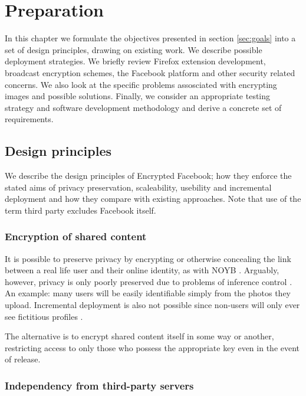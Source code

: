\chapter{Preparation}\label{ch:preparation}

In this chapter we formulate the objectives presented in section \ref{sec:goals} into a set of design principles, drawing on existing work. We describe possible deployment strategies. We briefly review Firefox extension development, broadcast encryption schemes, the Facebook platform and other security related concerns. We also look at the specific problems assosciated with encrypting images and possible solutions. Finally, we consider an appropriate testing strategy and software development methodology and derive a concrete set of requirements.


\FloatBarrier
\section{Design principles}


We describe the design principles of Encrypted Facebook; how they enforce the stated aims of privacy preservation, scaleability, usebility and incremental deployment and how they compare with existing approaches. Note that use of the term third party excludes Facebook itself.


\FloatBarrier
\subsection{Encryption of shared content}

It is possible to preserve privacy by encrypting or otherwise concealing the link between a real life user and their online identity, as with NOYB \cite{noyb}. Arguably, however, privacy is only poorly preserved due to problems of inference control \cite{ross}. An example: many users will be easily identifiable simply from the photos they upload. Incremental deployment is also not possible since non-users will only ever see fictitious profiles \cite{facecloak}.

The alternative is to encrypt shared content itself in some way or another, restricting access to only those who possess the appropriate key even in the event of release.


\FloatBarrier
\subsection{Independency from third-party servers}

